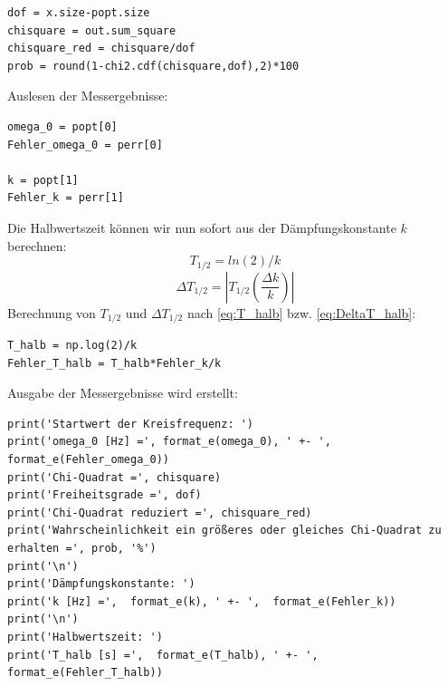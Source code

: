 \documentclass[a4paper,10pt]{article}
\begin{document}
\begin{lstlisting}
dof = x.size-popt.size
chisquare = out.sum_square
chisquare_red = chisquare/dof
prob = round(1-chi2.cdf(chisquare,dof),2)*100

\end{lstlisting}

Auslesen der Messergebnisse:\begin{lstlisting}
omega_0 = popt[0]
Fehler_omega_0 = perr[0]

k = popt[1]
Fehler_k = perr[1]

\end{lstlisting}

Die Halbwertszeit können wir nun sofort aus der Dämpfungskonstante \(k\) berechnen:
\begin{equation} \label{eq:T_halb}
T_{1/2} = ln(2)/k
\end{equation}
\begin{equation} \label{eq:DeltaT_halb}
\Delta T_{1/2}=|T_{1/2}\left(\frac{\Delta k}{k}\right)|
\end{equation}
Berechnung von \(T_{1/2}\) und \(\Delta T_{1/2}\) nach \eqref{eq:T_halb} bzw. \eqref{eq:DeltaT_halb}:\begin{lstlisting}
T_halb = np.log(2)/k
Fehler_T_halb = T_halb*Fehler_k/k

\end{lstlisting}

Ausgabe der Messergebnisse wird erstellt:\begin{lstlisting}
print('Startwert der Kreisfrequenz: ')
print('omega_0 [Hz] =', format_e(omega_0), ' +- ', format_e(Fehler_omega_0))
print('Chi-Quadrat =', chisquare)
print('Freiheitsgrade =', dof)
print('Chi-Quadrat reduziert =', chisquare_red)
print('Wahrscheinlichkeit ein größeres oder gleiches Chi-Quadrat zu erhalten =', prob, '%')
print('\n')
print('Dämpfungskonstante: ')
print('k [Hz] =',  format_e(k), ' +- ',  format_e(Fehler_k))
print('\n')
print('Halbwertszeit: ')
print('T_halb [s] =',  format_e(T_halb), ' +- ',  format_e(Fehler_T_halb))
\end{lstlisting}
\end{document}

